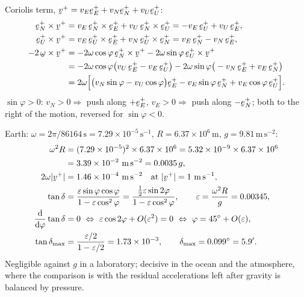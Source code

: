 \begin{solution}
Coriolis term, $\bv^{+}=v_{E}\be^{+}_{E}+v_{N}\be^{+}_{N}+v_{U}\be^{+}_{U}$:
\begin{align*}
   \be^{+}_{N}\times\bv^{+}
   &=v_{E}\,\be^{+}_{N}\times\be^{+}_{E}+v_{U}\,\be^{+}_{N}\times\be^{+}_{U}
    =-v_{E}\,\be^{+}_{U}+v_{U}\,\be^{+}_{E},\\
   \be^{+}_{U}\times\bv^{+}
   &=v_{E}\,\be^{+}_{U}\times\be^{+}_{E}+v_{N}\,\be^{+}_{U}\times\be^{+}_{N}
    =v_{E}\,\be^{+}_{N}-v_{N}\,\be^{+}_{E},\\
   -2\,\bom\times\bv^{+}
   &=-2\omega\cos\varphi\,\be^{+}_{N}\times\bv^{+}
     -2\omega\sin\varphi\,\be^{+}_{U}\times\bv^{+}\\
   &=-2\omega\cos\varphi\big(v_{U}\,\be^{+}_{E}-v_{E}\,\be^{+}_{U}\big)
     -2\omega\sin\varphi\big(-v_{N}\,\be^{+}_{E}+v_{E}\,\be^{+}_{N}\big)\\
   &=2\omega\Big[\big(v_{N}\sin\varphi-v_{U}\cos\varphi\big)\be^{+}_{E}
     -v_{E}\sin\varphi\,\be^{+}_{N}
     +v_{E}\cos\varphi\,\be^{+}_{U}\Big].
\end{align*}
$\sin\varphi>0$: $v_{N}>0\Rightarrow$ push along $+\be^{+}_{E}$,
$v_{E}>0\Rightarrow$ push along $-\be^{+}_{N}$; both to the right of the
motion, reversed for $\sin\varphi<0$.

Earth: $\omega=2\pi/86164\,\mathrm{s}=7.29\times10^{-5}\,\mathrm{s}^{-1}$,
$R=6.37\times10^{6}\,\mathrm{m}$, $g=9.81\,\mathrm{m\,s^{-2}}$:
\begin{align*}
   \omega^{2}R&=(7.29\times10^{-5})^{2}\times6.37\times10^{6}
     =5.32\times10^{-9}\times6.37\times10^{6}\\
     &=3.39\times10^{-2}\ \mathrm{m\,s^{-2}}=0.0035\,g,\\
   2\omega|\bv^{+}|&=1.46\times10^{-4}\ \mathrm{m\,s^{-2}}
     \quad\text{at }|\bv^{+}|=1\ \mathrm{m\,s^{-1}},\\
   \tan\delta&=\frac{\eps\sin\varphi\cos\varphi}{1-\eps\cos^{2}\varphi}
   =\frac{\tfrac12\eps\sin2\varphi}{1-\eps\cos^{2}\varphi},
   \qquad \eps=\frac{\omega^{2}R}{g}=0.00345,\\
   \frac{\dl}{\dl\varphi}\tan\delta&=0
   \ \Leftrightarrow\ \eps\cos2\varphi+O(\eps^{2})=0
   \ \Leftrightarrow\ \varphi=45^{\circ}+O(\eps),\\
   \tan\delta_{\max}&=\frac{\eps/2}{1-\eps/2}=1.73\times10^{-3},
   \qquad \delta_{\max}=0.099^{\circ}=5.9' .
\end{align*}
Negligible against $g$ in a laboratory; decisive in the ocean and the
atmosphere, where the comparison is with the residual accelerations
left after gravity is balanced by pressure.
\end{solution}

